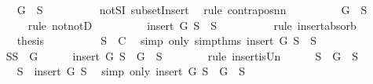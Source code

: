 \begin{isabellebody}
\ \ \ \ \ \ \isamarkupfalse%
\ {\isachardoublequoteopen}{\isasymnot}{\isacharparenleft}G\ {\isasymnotin}\ S{}{\isacharparenright}{\isachardoublequoteclose}\isanewline
\ \ \ \ \ \ \ \ \isamarkupfalse%
\ notSI\ subsetInsert\ \isamarkupfalse%
\ {\isacharparenleft}rule\ contrapos{\isacharunderscore}nn{\isacharparenright}\isanewline
\ \ \ \ \ \ \isamarkupfalse%
\ \isamarkupfalse%
\ {\isachardoublequoteopen}G\ {\isasymin}\ S{}{\isachardoublequoteclose}\isanewline
\ \ \ \ \ \ \ \ \isamarkupfalse%
\ {\isacharparenleft}rule\ notnotD{\isacharparenright}\isanewline
\ \ \ \ \ \ \isamarkupfalse%
\ \isamarkupfalse%
\ {\isachardoublequoteopen}insert\ G\ S{}\ {\isacharequal}\ S{}{\isachardoublequoteclose}\isanewline
\ \ \ \ \ \ \ \ \isamarkupfalse%
\ {\isacharparenleft}rule\ insert{\isacharunderscore}absorb{\isacharparenright}\isanewline
\ \ \ \ \ \ \isamarkupfalse%
\ {\isacharquery}thesis\isanewline
\ \ \ \ \ \ \ \ \isamarkupfalse%
\ {\isacartoucheopen}S{}\ {\isasymnotin}\ C{\isacartoucheclose}\ \isamarkupfalse%
\ {\isacharparenleft}simp\ only{\isacharcolon}\ simp{\isacharunderscore}thms{\isacharparenleft}{}{\isacharparenright}\ {\isacartoucheopen}insert\ G\ S{}\ {\isacharequal}\ S{}{\isacartoucheclose}{\isacharparenright}\isanewline
\ \ \ \ \isamarkupfalse%
\ \isanewline
\ \ \ \ \isamarkupfalse%
\ {\isacharquery}S{}{\isacharequal}{\isachardoublequoteopen}S{}\ {\isacharminus}\ {\isacharbraceleft}G{\isacharbraceright}{\isachardoublequoteclose}\isanewline
\ \ \ \ \isamarkupfalse%
\ {\isachardoublequoteopen}insert\ G\ S\ {\isacharequal}\ {\isacharbraceleft}G{\isacharbraceright}\ {\isasymunion}\ S{\isachardoublequoteclose}\isanewline
\ \ \ \ \ \ \isamarkupfalse%
\ {\isacharparenleft}rule\ insert{\isacharunderscore}is{\isacharunderscore}Un{\isacharparenright}\isanewline
\ \ \ \ \isamarkupfalse%
\ {\isachardoublequoteopen}S{}\ {\isasymsubseteq}\ {\isacharbraceleft}G{\isacharbraceright}\ {\isasymunion}\ S{\isachardoublequoteclose}\isanewline
\ \ \ \ \ \ \isamarkupfalse%
\ {\isacartoucheopen}S{}\ {\isasymsubseteq}\ insert\ G\ S{\isacartoucheclose}\ \isamarkupfalse%
\ {\isacharparenleft}simp\ only{\isacharcolon}\ {\isacartoucheopen}insert\ G\ S\ {\isacharequal}\ {\isacharbraceleft}G{\isacharbraceright}\ {\isasymunion}\ S{\isacartoucheclose}{\isacharparenright}\isanewline

\end{isabellebody}
